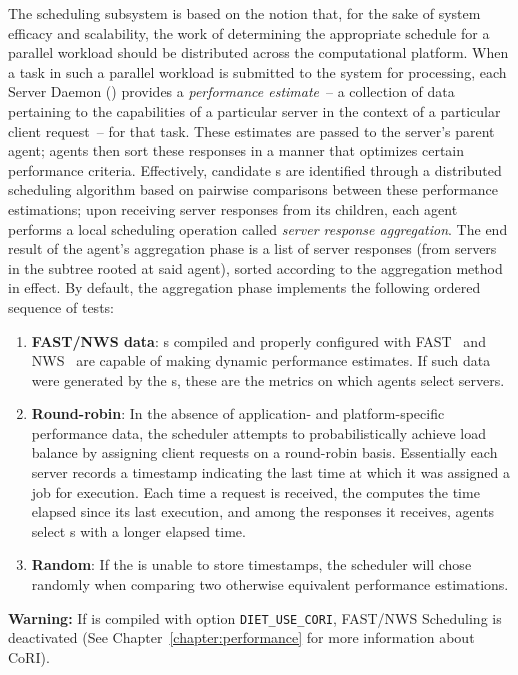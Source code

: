 The \diet scheduling subsystem is based on the notion that, for the sake of
system efficacy and scalability, the work of determining the appropriate
schedule for a parallel workload should be distributed across the computational
platform.  When a task in such a parallel workload is submitted to the system
for processing, each Server Daemon (\sed) provides a \emph{performance
  estimate}~-- a collection of data pertaining to the capabilities of a
particular server in the context of a particular client request~-- for that
task.  These estimates are passed to the server's parent agent; agents then
sort these responses in a manner that optimizes certain performance criteria.
Effectively, candidate {\sed}s are identified through a distributed scheduling
algorithm based on pairwise comparisons between these performance estimations;
upon receiving server responses from its children, each agent performs a local
scheduling operation called \emph{server response aggregation}.  The end result
of the agent's aggregation phase is a list of server responses (from servers in
the subtree rooted at said agent), sorted according to the aggregation method
in effect. By default, the aggregation phase implements the following ordered
sequence of tests:

\begin{enumerate}
\item \textbf{FAST/NWS data}: {\sed}s compiled and properly configured with
  FAST~\cite{Qui02} and NWS~\cite{WSH99} are capable of making dynamic
  performance estimates.  If such data were generated by the {\sed}s, these are
  the metrics on which agents select servers.
\item \textbf{Round-robin}: In the absence of application- and
  platform-specific performance data, the \diet scheduler attempts to
  probabilistically achieve load balance by assigning client requests on a
  round-robin basis.  Essentially each server records a timestamp indicating
  the last time at which it was assigned a job for execution.  Each time a
  request is received, the \sed computes the time elapsed since its last
  execution, and among the responses it receives, \diet agents select {\sed}s
  with a longer elapsed time.
\item \textbf{Random}: If the {\sed} is unable to store timestamps, the \diet
  scheduler will chose randomly when comparing two otherwise equivalent {\sed}
  performance estimations.
\end{enumerate}

\textbf{Warning:} If \diet is compiled with option \texttt{DIET\_USE\_CORI},
FAST/NWS Scheduling is deactivated (See Chapter~\ref{chapter:performance} for
more information about CoRI).

